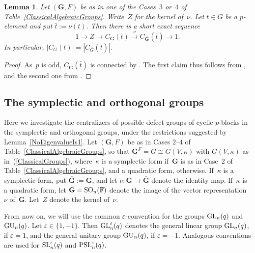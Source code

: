 \documentclass[12pt]{amsart}
\newcommand{\bG}{{\mathbf{G}}}      %
\def\GL{ \text{\rm GL} }
\def\GU{ \text{\rm GU} }
\def\SO{ \text{\rm SO} }
\def\SL{ \text{\rm SL} }
\def\PSL{ \text{\rm PSL} }
\def\SO{ \text{\rm SO} }
\newtheorem{lem}[thm]{Lemma}
\theoremstyle{theorem}
\theoremstyle{definition}
\theoremstyle{remark}
\begin{document}
\begin{lem}
\label{NonTypeAClassicalGroups}
Let $(\mathbf{G},F)$ be as in one of the Cases~$3$ or~$4$ of 
{\rm Table~\ref{ClassicalAlgebraicGroups}}. Write~$Z$ for the kernel of~$\nu$. 
Let $t \in G$ be a $p$-element and put $\bar{t} := \nu( t )$. Then there is a 
short exact sequence
\begin{equation}
\label{IsogenyOfCentralizers}
1 \longrightarrow Z \longrightarrow C_{\bG}( t ) \stackrel{\nu}{\longrightarrow} 
C_{\bar{\bG}}( \bar{t} ) \longrightarrow 1.
\end{equation}
In particular, $|C_G( t )| = |C_{\bar{G}}( \bar{t} )|$.
\end{lem}
\begin{proof}
As~$p$ is odd, $C_{\bar{\bG}}( \bar{t} )$ is connected by 
\cite[Corollary~$2.6$]{GeHi1}. The first claim thus follows from 
\cite[$1.3.10$(e)]{GeMa}, and the second one 
from \cite[Proposition~$1.4.13$(c)]{GeMa}. 
\end{proof}

\subsection{The symplectic and orthogonal groups} 
\label{TheSymplecticAndOrthogonalGroups} Here we investigate the 
centralizers of possible defect groups of cyclic $p$-blocks in the symplectic
and orthogonal groups, under the restrictions suggested by 
Lemma~\ref{NoEigenvalueIs1}. Let $(\bG,F)$ be as in Cases $2$--$4$ of 
Table~\ref{ClassicalAlgebraicGroups}, so that $\bG^F = G \cong G( V, \kappa )$ with 
$G( V, \kappa )$ as in~{\rm (\ref{ClassicalGroups})}, where~$\kappa$ is a 
symplectic form if~$\bG$ is as in Case~$2$ of 
Table~\ref{ClassicalAlgebraicGroups}, and a quadratic form, otherwise. 
If~$\kappa$ is a symplectic form, put $\bar{\bG} := \bG$, and let 
$\nu : \bG \rightarrow \bar{\bG}$ denote the identity map.
If~$\kappa$ is a quadratic form, let $\bar{\bG} = \SO_n( \mathbb{F} )$ denote 
the image of the vector representation~$\nu$ of~$\bG$. Let~$Z$ denote the kernel
of~$\nu$.

From now on, we will use the common $\varepsilon$-convention for 
the groups $\GL_n(q)$ and $\GU_n(q)$. Let $\varepsilon \in \{ 1, -1 \}$. Then 
$\GL^\varepsilon_n(q)$ denotes the general linear group $\GL_n(q)$, if 
$\varepsilon = 1$, and the general unitary group $\GU_n(q)$, if 
$\varepsilon = -1$.  Analogous conventions are used for $\SL^\varepsilon_n(q)$ 
and $\PSL^\varepsilon_n(q)$.
\end{document}
